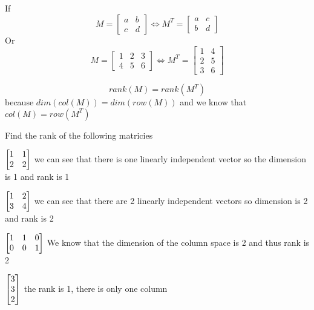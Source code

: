 \documentclass[11pt]{book}
\begin{document}
\begin{eg}
    If 
    \[
    M = 
    \begin{bmatrix}
    	a & b \\
    	c & d 
    \end{bmatrix}
    \Leftrightarrow
    M^{T} = 
    \begin{bmatrix}
    	a & c \\
    	b & d 
    \end{bmatrix}
    \]
    Or 
    \[
    M = 
    \begin{bmatrix}
    	1 & 2 & 3 \\
    	4 & 5 & 6 
    \end{bmatrix}
    \Leftrightarrow
    M^{T} = 
    \begin{bmatrix}
    	1 & 4 \\
    	2 & 5 \\
    	3 & 6 
    \end{bmatrix}
    \]
\end{eg}

\begin{crly}
    \[
    rank\left(M\right) = rank\left(M^{T}\right)
    \]
    because $dim\left(col\left(M\right)\right) = dim\left(row\left(M\right)\right)$ and we know that $col\left(M\right) = row\left(M^{T}\right)$ 
\end{crly}

Find the rank of the following matricies
\begin{ex}
    $\begin{bmatrix} 1 & 1 \\ 2 & 2 \end{bmatrix}$ we can see that there is one linearly independent vector so the dimension is 1 and rank is 1
\end{ex}

\begin{ex}
    $\begin{bmatrix} 1 & 2 \\ 3 & 4 \end{bmatrix}$ we can see that there are 2 linearly independent vectors so dimension is 2 and rank is 2
\end{ex}

\begin{ex}
    $\begin{bmatrix} 1 & 1 & 0 \\ 0 & 0 & 1 \end{bmatrix}$ We know that the dimension of the column space is 2 and thus rank is 2
\end{ex}

\begin{ex}
    $\begin{bmatrix} 3 \\ 3 \\ 2 \end{bmatrix}$ the rank is 1, there is only one column
\end{ex}
\end{document}
